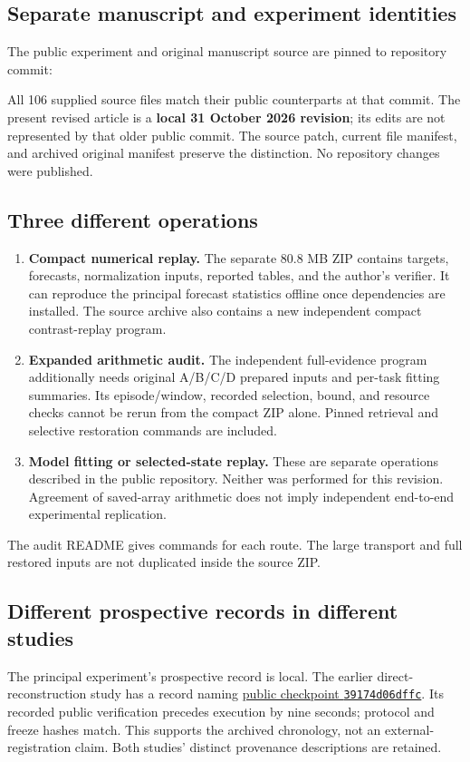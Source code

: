 \documentclass[11pt]{article}
\begin{document}
\subsection*{Separate manuscript and experiment identities}
The public experiment and original manuscript source are pinned to
repository commit:
\begin{quote}
\small{}
\end{quote}
All 106 supplied source files match their public counterparts at that
commit. The present revised article is a \textbf{local 31 October 2026
revision}; its edits are not represented by that older public commit.
The source patch, current file manifest, and archived original manifest
preserve the distinction. No repository changes were published.

\subsection*{Three different operations}
\begin{enumerate}
\item \textbf{Compact numerical replay.} The separate 80.8 MB ZIP contains
targets, forecasts, normalization inputs, reported tables, and the
author's verifier. It can reproduce the principal forecast statistics
offline once dependencies are installed. The source archive also
contains a new independent compact contrast-replay program.
\item \textbf{Expanded arithmetic audit.} The independent full-evidence
program additionally needs original A/B/C/D prepared inputs and
per-task fitting summaries. Its episode/window, recorded selection,
bound, and resource checks cannot be rerun from the compact ZIP alone.
Pinned retrieval and selective restoration commands are included.
\item \textbf{Model fitting or selected-state replay.} These are separate
operations described in the public repository. Neither was performed
for this revision. Agreement of saved-array arithmetic does not imply
independent end-to-end experimental replication.
\end{enumerate}

The audit README gives commands for each route. The large transport and
full restored inputs are not duplicated inside the source ZIP.

\subsection*{Different prospective records in different studies}
The principal experiment's prospective record is local. The earlier
direct-reconstruction study has a  record naming
\href{https://github.com/MohitKumarRostock/Kernel_Affine_Hull_Koopman_Machine/commit/39174d06dffc7e28fed73dbbf866e539560dd021}{public checkpoint \texttt{39174d06dffc}}.
Its recorded public verification precedes execution by nine seconds;
protocol and freeze hashes match. This supports the archived chronology,
not an external-registration claim. Both studies' distinct provenance
descriptions are retained.
\end{document}
